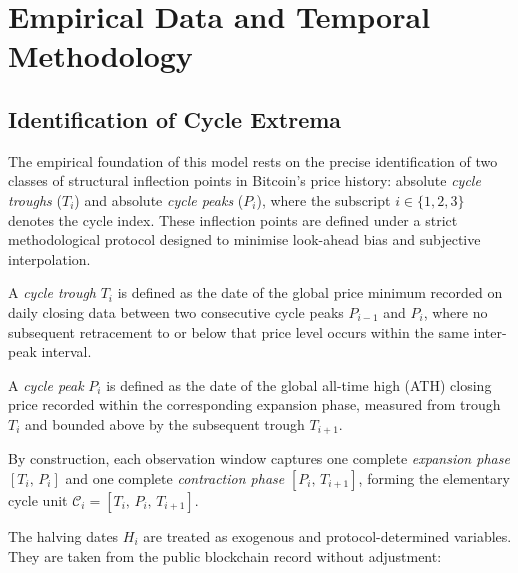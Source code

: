 
\section{Empirical Data and Temporal Methodology}

\subsection{Identification of Cycle Extrema}

The empirical foundation of this model rests on the precise identification of
two classes of structural inflection points in Bitcoin's price history: absolute
\textit{cycle troughs} ($T_i$) and absolute \textit{cycle peaks} ($P_i$), where
the subscript $i \in \{1, 2, 3\}$ denotes the cycle index. These inflection
points are defined under a strict methodological protocol designed to minimise
look-ahead bias and subjective interpolation.

\begin{definition}
A \textit{cycle trough} $T_i$ is defined as the date of the global price
minimum recorded on daily closing data between two consecutive cycle peaks
$P_{i-1}$ and $P_i$, where no subsequent retracement to or below that price
level occurs within the same inter-peak interval.
\end{definition}

\begin{definition}
A \textit{cycle peak} $P_i$ is defined as the date of the global all-time high
(ATH) closing price recorded within the corresponding expansion phase, measured
from trough $T_i$ and bounded above by the subsequent trough $T_{i+1}$.
\end{definition}

By construction, each observation window captures one complete
\textit{expansion phase} $[T_i,\, P_i]$ and one complete \textit{contraction
phase} $[P_i,\, T_{i+1}]$, forming the elementary cycle unit
$\mathcal{C}_i = [T_i,\, P_i,\, T_{i+1}]$.

The halving dates $H_i$ are treated as exogenous and protocol-determined
variables. They are taken from the public blockchain record without adjustment:

